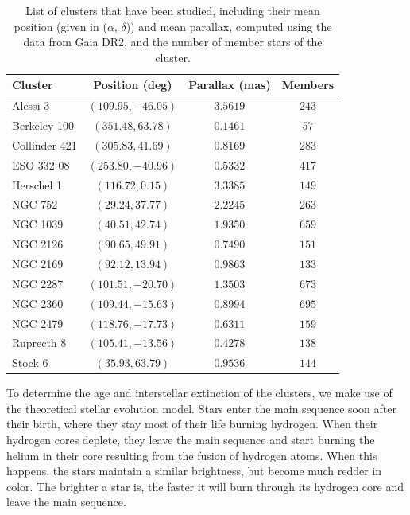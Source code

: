 \documentclass[twocolumn]{revtex4}
\begin{document}
\begin{table}[h!]
\begin{tabular}{|l|c|c|c|}
\hline
\textbf{Cluster} & \textbf{Position (deg)} & \textbf{Parallax (mas)} & \textbf{Members} \\
\hline
Alessi 3 & $(109.95, -46.05)$ & $3.5619$ & $243$ \\
\hline
Berkeley 100 & $(351.48, 63.78)$ & $0.1461$ & $57$ \\
\hline
Collinder 421 & $(305.83, 41.69)$ & $0.8169$ & $283$ \\
\hline
ESO 332 08 & $(253.80, -40.96)$ & $0.5332$ & $417$ \\
\hline
Herschel 1 & $(116.72, 0.15)$ & $3.3385$ & $149$ \\
\hline
NGC 752 & $(29.24, 37.77)$ & $2.2245$ & $263$ \\
\hline
NGC 1039 & $(40.51, 42.74)$ & $1.9350$ & $659$ \\
\hline
NGC 2126 & $(90.65, 49.91)$ & $0.7490$ & $151$ \\
\hline
NGC 2169 & $(92.12, 13.94)$ & $0.9863$ & $133$ \\
\hline
NGC 2287 & $(101.51, -20.70)$ & $1.3503$ & $673$ \\
\hline
NGC 2360 & $(109.44, -15.63)$ & $0.8994$ & $695$ \\
\hline
NGC 2479 & $(118.76, -17.73)$ & $0.6311$ & $159$ \\
\hline
Ruprecth 8 & $(105.41, -13.56)$ & $0.4278$ & $138$ \\
\hline
Stock 6 & $(35.93, 63.79)$ & $0.9536$ & $144$ \\
\hline
\end{tabular}
\caption{List of clusters that have been studied, including their mean position (given in ($\alpha$, $\delta$)) and mean parallax, computed using the data from Gaia DR2, and the number of member stars of the cluster.}
\label{tab:clusters}
\end{table}

To determine the age and interstellar extinction of the clusters, we make use of the theoretical stellar evolution model. Stars enter the main sequence soon after their birth, where they stay most of their life burning hydrogen. When their hydrogen cores deplete, they leave the main sequence and start burning the helium in their core resulting from the fusion of hydrogen atoms. When this happens, the stars maintain a similar brightness, but become much redder in color. The brighter a star is, the faster it will burn through its hydrogen core and leave the main sequence.
\end{document}
